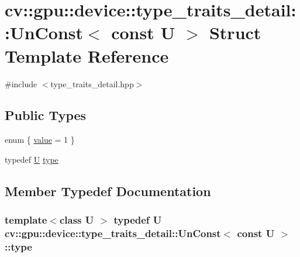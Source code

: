 \hypertarget{structcv_1_1gpu_1_1device_1_1type__traits__detail_1_1UnConst_3_01const_01U_01_4}{\section{cv\-:\-:gpu\-:\-:device\-:\-:type\-\_\-traits\-\_\-detail\-:\-:Un\-Const$<$ const U $>$ Struct Template Reference}
\label{structcv_1_1gpu_1_1device_1_1type__traits__detail_1_1UnConst_3_01const_01U_01_4}
}


{\ttfamily \#include $<$type\-\_\-traits\-\_\-detail.\-hpp$>$}

\subsection*{Public Types}
\begin{DoxyCompactItemize}
\item 
enum \{ \hyperlink{structcv_1_1gpu_1_1device_1_1type__traits__detail_1_1UnConst_3_01const_01U_01_4_a26f2b8eed397c3fb9d068eb8c446bf7ca3327f0561c53b1580e846e8bfb104c84}{value} = 1
 \}
\item 
typedef \hyperlink{core__c_8h_aa9c521f41af9a5191e5e4b6ffbae211a}{U} \hyperlink{structcv_1_1gpu_1_1device_1_1type__traits__detail_1_1UnConst_3_01const_01U_01_4_aa1bbcee9475d33b089cd087ef9531c75}{type}
\end{DoxyCompactItemize}


\subsection{Member Typedef Documentation}
\hypertarget{structcv_1_1gpu_1_1device_1_1type__traits__detail_1_1UnConst_3_01const_01U_01_4_aa1bbcee9475d33b089cd087ef9531c75}{
\subsubsection[{type}]{\setlength{\rightskip}{0pt plus 5cm}template$<$class U $>$ typedef {\bf U} {\bf cv\-::gpu\-::device\-::type\-\_\-traits\-\_\-detail\-::\-Un\-Const}$<$ const {\bf U} $>$\-::{\bf type}}}\label{structcv_1_1gpu_1_1device_1_1type__traits__detail_1_1UnConst_3_01const_01U_01_4_aa1bbcee9475d33b089cd087ef9531c75}



